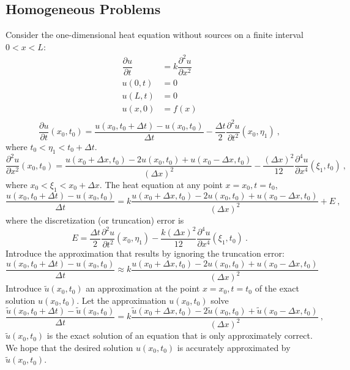 \documentclass[12pt,a4paper]{article}
\begin{document}
\subsection{Homogeneous Problems}
Consider the one-dimensional heat equation without sources on a finite interval $0< x < L$:
\begin{align*}
\dfrac{\partial u}{\partial t} &= k \dfrac{\partial^2 u}{\partial x^2} \\
u(0, t) &= 0 \\
u(L, t) &= 0 \\
u(x, 0) &= f(x) \\
\end{align*}
\begin{equation*}
\dfrac{\partial u}{\partial t} (x_0, t_0) = \frac{u(x_0, t_0+\Delta t) -u(x_0, t_0)}{\Delta t} -\frac{\Delta t}{2} \dfrac{\partial^2 u}{\partial t^2} (x_0, \eta_1)  ~,
\end{equation*}
where $t_0 < \eta_1 < t_0 +\Delta t$.
\begin{equation}
\dfrac{\partial^2 u}{\partial x^2}(x_0, t_0) = \frac{u(x_0 +\Delta x, t_0) -2u(x_0, t_0) + u(x_0 -\Delta x, t_0)}{(\Delta x)^2} -\frac{(\Delta x)^2}{12} \dfrac{\partial^4 u}{\partial x^4} (\xi_1, t_0)  ~,
\end{equation}
where $x_0 < \xi_1 < x_0 +\Delta x$. The heat equation at any point $x=x_0, t=t_0$,
\begin{equation}
\frac{u(x_0, t_0+\Delta t) -u(x_0, t_0)}{\Delta t} = k \frac{u(x_0 +\Delta x, t_0) -2u(x_0, t_0) + u(x_0 -\Delta x, t_0)}{(\Delta x)^2} +E ~,
\end{equation}
where the discretization (or truncation) error is
\begin{equation}
E = \frac{\Delta t}{2} \dfrac{\partial^2 u}{\partial t^2} (x_0, \eta_1) -\frac{k(\Delta x)^2}{12} \dfrac{\partial^4 u}{\partial x^4} (\xi_1, t_0) ~.
\label{trun_err}
\end{equation}
Introduce the approximation that results by ignoring the truncation error:
\begin{equation}
\frac{u(x_0, t_0+\Delta t) -u(x_0, t_0)}{\Delta t} \approx k \frac{u(x_0 +\Delta x, t_0) -2u(x_0, t_0) + u(x_0 -\Delta x, t_0)}{(\Delta x)^2} 
\end{equation}
Introduce $\tilde{u}(x_0, t_0)$ an approximation at the point $x=x_0, t=t_0$ of the exact solution $u(x_0,t_0)$. Let the approximation $u(x_0,t_0)$ solve
\begin{equation}
\frac{\tilde{u}(x_0, t_0+\Delta t) -\tilde{u}(x_0, t_0)}{\Delta t} = k \frac{\tilde{u}(x_0 +\Delta x, t_0) -2\tilde{u}(x_0, t_0) + \tilde{u}(x_0 -\Delta x, t_0)}{(\Delta x)^2} ~,
\label{tilde_equ}
\end{equation}
$\tilde{u}(x_0,t_0)$ is the exact solution of an equation that is only approximately correct. We  hope that the desired solution $u(x_0,t_0)$ is accurately approximated by $\tilde{u}(x_0,t_0)$.
\end{document}
